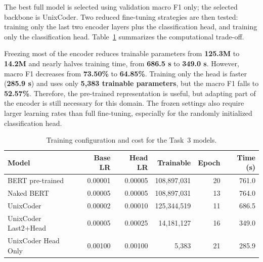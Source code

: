 The best full model is selected using validation macro F1 only; the selected
backbone is UnixCoder. Two reduced fine-tuning strategies are then tested:
training only the last two encoder layers plus the classification head, and
training only the classification head. Table~\ref{tab:task3_training_cost}
summarizes the computational trade-off.

Freezing most of the encoder reduces trainable parameters from
\textbf{125.3M} to \textbf{14.2M} and nearly halves training time, from
\textbf{686.5 s} to \textbf{349.0 s}. However, macro F1 decreases from
\textbf{73.50\%} to \textbf{64.85\%}. Training only the head is faster
(\textbf{285.9 s}) and uses only \textbf{5,383 trainable parameters}, but the
macro F1 falls to \textbf{52.57\%}. Therefore, the pre-trained representation is
useful, but adapting part of the encoder is still necessary for this domain.
The frozen settings also require larger learning rates than full fine-tuning,
especially for the randomly initialized classification head.

\vspace{0.2cm}

\begin{table}[H]
    \centering
    \small
    \begin{tabular}{lrrrrr}
        \toprule
        \textbf{Model} & \textbf{Base LR} & \textbf{Head LR} &
        \textbf{Trainable} & \textbf{Epoch} & \textbf{Time (s)} \\
        \midrule
        BERT pre-trained & 0.00001 & 0.00005 & 108,897,031 & 20 & 761.0 \\
        Naked BERT & 0.00005 & 0.00005 & 108,897,031 & 13 & 764.0 \\
        UnixCoder & 0.00002 & 0.00010 & 125,344,519 & 11 & 686.5 \\
        UnixCoder Last2+Head & 0.00005 & 0.00025 & 14,181,127 & 16 & 349.0 \\
        UnixCoder Head Only & 0.00100 & 0.00100 & 5,383 & 21 & 285.9 \\
        \bottomrule
    \end{tabular}
    \vspace{0.1cm}
    \caption{Training configuration and cost for the Task~3 models.}
    \label{tab:task3_training_cost}
\end{table}
